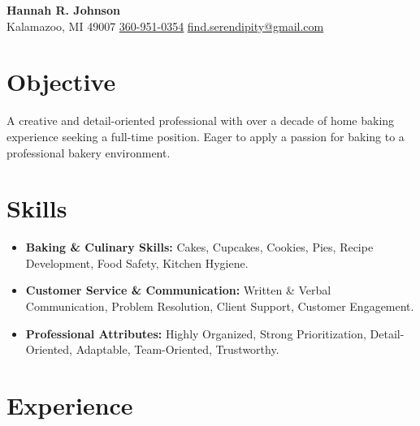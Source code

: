 \documentclass[a4paper,10pt]{article}
\begin{document}
\begin{center}
    {\LARGE \textbf{Hannah R. Johnson}} \\
    \vspace{1mm}
    Kalamazoo, MI 49007 \textbar{} \href{tel:360-951-0354}{360-951-0354} \textbar{} \href{mailto:find.serendipity@gmail.com}{find.serendipity@gmail.com}
\end{center}

\section{Objective}
A creative and detail-oriented professional with over a decade of home baking experience seeking a full-time position. Eager to apply a passion for baking to a professional bakery environment.
\section{Skills}

\begin{itemize}[leftmargin=*, nosep]
    \item \textbf{Baking \& Culinary Skills:} Cakes, Cupcakes, Cookies, Pies, Recipe Development, Food Safety, Kitchen Hygiene.
    \item \textbf{Customer Service \& Communication:} Written \& Verbal Communication, Problem Resolution, Client Support, Customer Engagement.
    \item \textbf{Professional Attributes:} Highly Organized, Strong Prioritization, Detail-Oriented, Adaptable, Team-Oriented, Trustworthy.
\end{itemize}

\section{Experience}
\end{document}
